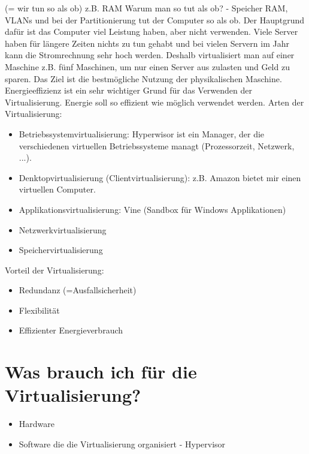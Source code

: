 \documentclass[a4paper]{report}
\begin{document}
(= wir tun so als ob) z.B. RAM
\newline
Warum man so tut als ob? - Speicher RAM, VLANs und bei der Partitionierung tut der Computer so als ob.
\newline
Der Hauptgrund dafür ist das Computer viel Leistung haben, aber nicht verwenden. Viele Server haben für längere Zeiten nichts zu tun gehabt und bei vielen Servern im Jahr kann die Stromrechnung sehr hoch werden.
Deshalb virtualisiert man auf einer Maschine z.B. fünf Maschinen, um nur einen Server aus zulasten und Geld zu sparen.
\newline
Das Ziel ist die bestmögliche Nutzung der physikalischen Maschine. Energieeffizienz ist ein sehr wichtiger Grund für das Verwenden der Virtualisierung. Energie soll so effizient wie möglich verwendet werden.
\newline
Arten der Virtualisierung:

\begin{itemize}
\item Betriebssystemvirtualisierung: Hyperwisor ist ein Manager, der die verschiedenen virtuellen Betriebssysteme managt (Prozessorzeit, Netzwerk, ...).

\item Denktopvirtualisierung (Clientvirtualisierung): z.B. Amazon bietet mir einen virtuellen Computer.

\item Applikationsvirtualisierung: Vine (Sandbox für Windows Applikationen)

\item Netzwerkvirtualisierung

\item Speichervirtualisierung
\end{itemize}

Vorteil der Virtualisierung:

\begin{itemize}
\item Redundanz (=Ausfallsicherheit)
\item Flexibilität
\item Effizienter Energieverbrauch
\end{itemize}

\newpage

\chapter{Was brauch ich für die Virtualisierung?}
\begin{itemize}
\item Hardware
\item Software die die Virtualisierung organisiert - Hypervisor 
\end{itemize}
\end{document}
